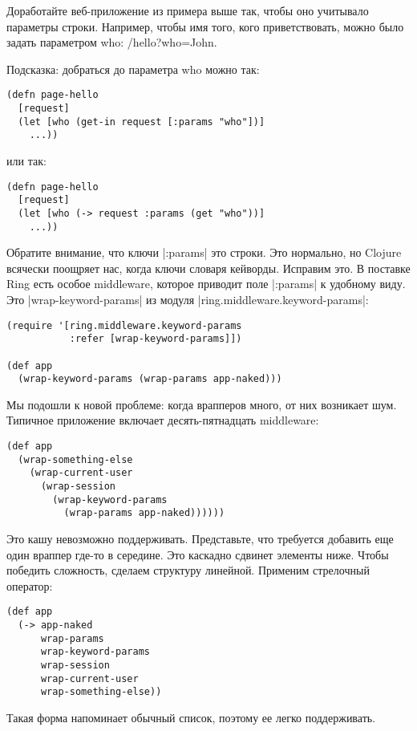 Доработайте веб-приложение из примера выше так, чтобы оно учитывало параметры
строки. Например, чтобы имя того, кого приветствовать, можно было задать
параметром who: /hello?who=John.

Подсказка: добраться до параметра who можно так:

\begin{verbatim}
(defn page-hello
  [request]
  (let [who (get-in request [:params "who"])]
    ...))
\end{verbatim}

или так:

\begin{verbatim}
(defn page-hello
  [request]
  (let [who (-> request :params (get "who"))]
    ...))
\end{verbatim}

Обратите внимание, что ключи \spverb|:params| это строки. Это нормально, но Clojure
всячески поощряет нас, когда ключи словаря кейворды. Исправим это. В поставке
Ring есть особое middleware, которое приводит поле \spverb|:params| к удобному
виду. Это \spverb|wrap-keyword-params| из модуля \spverb|ring.middleware.keyword-params|:

\begin{verbatim}
(require '[ring.middleware.keyword-params
           :refer [wrap-keyword-params]])

(def app
  (wrap-keyword-params (wrap-params app-naked)))
\end{verbatim}

Мы подошли к новой проблеме: когда врапперов много, от них возникает
шум. Типичное приложение включает десять-пятнадцать middleware:

\begin{verbatim}
(def app
  (wrap-something-else
    (wrap-current-user
      (wrap-session
        (wrap-keyword-params
          (wrap-params app-naked))))))
\end{verbatim}

Это кашу невозможно поддерживать. Представьте, что требуется добавить еще один
враппер где-то в середине. Это каскадно сдвинет элементы ниже. Чтобы победить
сложность, сделаем структуру линейной. Применим стрелочный оператор:

\begin{verbatim}
(def app
  (-> app-naked
      wrap-params
      wrap-keyword-params
      wrap-session
      wrap-current-user
      wrap-something-else))
\end{verbatim}

Такая форма напоминает обычный список, поэтому ее легко поддерживать.


